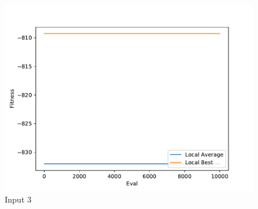\documentclass{standalone}
\begin{document}
\begin{figure}[!htb]
	\caption{Input 3}
	\label{fig:graph_3058}
	\includegraphics[width=\textwidth]{../graphs/graphs/3058.pdf}
\end{figure}
\end{document}
